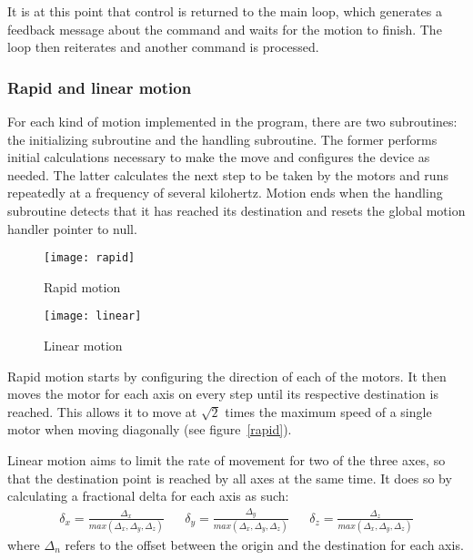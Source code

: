 It is at this point that control is returned to the main loop, which generates
a feedback message about the command and waits for the motion to finish. The
loop then reiterates and another command is processed.

\subsubsection{Rapid and linear motion}

For each kind of motion implemented in the program, there are two subroutines:
the initializing subroutine and the handling subroutine. The former performs
initial calculations necessary to make the move and configures the device as
needed. The latter calculates the next step to be taken by the motors and runs
repeatedly at a frequency of several kilohertz. Motion ends when the handling
subroutine detects that it has reached its destination and resets the global
motion handler pointer to null.

\begin{figure}[ht]
    \centering
    \begin{minipage}{0.5\textwidth}
        \centering
        \texttt{[image: rapid]}
        \caption{Rapid motion}
        \label{rapid}
    \end{minipage}\hfill
    \begin{minipage}{0.5\textwidth}
        \centering
        \texttt{[image: linear]}
        \caption{Linear motion}
        \label{linear}
    \end{minipage}
\end{figure}

Rapid motion starts by configuring the direction of each of the motors. It then
moves the motor for each axis on every step until its respective destination
is reached. This allows it to move at $\sqrt{2}$ times the maximum speed of
a single motor when moving diagonally (see figure~\ref{rapid}).

Linear motion aims to limit the rate of movement for two of the three axes, so
that the destination point is reached by all axes at the same time. It does so
by calculating a fractional delta for each axis as such:
\begin{align*}
    \delta_{x} = \frac{\Delta_{x}}{max(\Delta_{x}, \Delta_{y}, \Delta_{z})} &&
    \delta_{y} = \frac{\Delta_{y}}{max(\Delta_{x}, \Delta_{y}, \Delta_{z})} &&
    \delta_{z} = \frac{\Delta_{z}}{max(\Delta_{x}, \Delta_{y}, \Delta_{z})}
\end{align*}
where $\Delta_n$ refers to the offset between the origin and the destination for
each axis.

